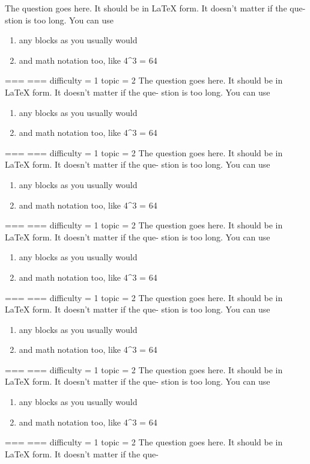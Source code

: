 The question goes here. It should be in LaTeX form. It doesn't matter if the que-
stion is too long. You can use
\begin{enumerate}
    \item any blocks as you usually would
    \item and math notation too, like 4^3 = 64
\end{enumerate}
===
===
difficulty = 1
topic = 2
The question goes here. It should be in LaTeX form. It doesn't matter if the que-
stion is too long. You can use
\begin{enumerate}
    \item any blocks as you usually would
    \item and math notation too, like 4^3 = 64
\end{enumerate}
===
===
difficulty = 1
topic = 2
The question goes here. It should be in LaTeX form. It doesn't matter if the que-
stion is too long. You can use
\begin{enumerate}
    \item any blocks as you usually would
    \item and math notation too, like 4^3 = 64
\end{enumerate}
===
===
difficulty = 1
topic = 2
The question goes here. It should be in LaTeX form. It doesn't matter if the que-
stion is too long. You can use
\begin{enumerate}
    \item any blocks as you usually would
    \item and math notation too, like 4^3 = 64
\end{enumerate}
===
===
difficulty = 1
topic = 2
The question goes here. It should be in LaTeX form. It doesn't matter if the que-
stion is too long. You can use
\begin{enumerate}
    \item any blocks as you usually would
    \item and math notation too, like 4^3 = 64
\end{enumerate}
===
===
difficulty = 1
topic = 2
The question goes here. It should be in LaTeX form. It doesn't matter if the que-
stion is too long. You can use
\begin{enumerate}
    \item any blocks as you usually would
    \item and math notation too, like 4^3 = 64
\end{enumerate}
===
===
difficulty = 1
topic = 2
The question goes here. It should be in LaTeX form. It doesn't matter if the que-
